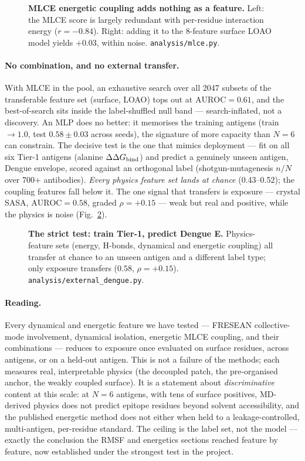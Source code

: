 \begin{figure}[H]\centering
{}
\caption{\textbf{MLCE energetic coupling adds nothing as a feature.} Left: the MLCE score is largely
redundant with per-residue interaction energy ($r=-0.84$). Right: adding it to the 8-feature surface LOAO
model yields $+0.03$, within noise. \texttt{analysis/mlce.py}.}
\label{fig:mlce-feature}
\end{figure}

\paragraph{No combination, and no external transfer.} With MLCE in the pool, an exhaustive search over all
2047 subsets of the transferable feature set (surface, LOAO) tops out at $\mathrm{AUROC}=0.61$, and the
best-of-search sits inside the label-shuffled null band --- search-inflated, not a discovery. An MLP does no
better: it memorises the training antigens (train $\to1.0$, test $0.58\pm0.03$ across seeds), the signature
of more capacity than $N=6$ can constrain. The decisive test is the one that mimics deployment --- fit on all
six Tier-1 antigens (alanine $\Delta\Delta G_{\mathrm{bind}}$) and predict a genuinely unseen antigen, Dengue envelope, scored against
an orthogonal label (shotgun-mutagenesis $n/N$ over 700+ antibodies). \emph{Every physics feature set lands at
chance} (0.43--0.52); the coupling features fall below it. The one signal that transfers is exposure ---
crystal SASA, $\mathrm{AUROC}=0.58$, graded $\rho=+0.15$ --- weak but real and positive, while the physics is
noise (Fig.~\ref{fig:external}).

\begin{figure}[H]\centering
{}
\caption{\textbf{The strict test: train Tier-1, predict Dengue E.} Physics-feature sets (energy, H-bonds,
dynamical and energetic coupling) all transfer at chance to an unseen antigen and a different label type;
only exposure transfers ($0.58$, $\rho=+0.15$). \texttt{analysis/external\_dengue.py}.}
\label{fig:external}
\end{figure}

\paragraph{Reading.} Every dynamical and energetic feature we have tested --- FRESEAN collective-mode
involvement, dynamical isolation, energetic MLCE coupling, and their combinations --- reduces to exposure
once evaluated on surface residues, across antigens, or on a held-out antigen. This is not a failure of the
methods; each measures real, interpretable physics (the decoupled patch, the pre-organised anchor, the weakly
coupled surface). It is a statement about \emph{discriminative} content at this scale: at $N=6$ antigens, with
tens of surface positives, MD-derived physics does not predict epitope residues beyond solvent accessibility,
and the published energetic method does not either when held to a leakage-controlled, multi-antigen,
per-residue standard. The ceiling is the label set, not the model --- exactly the conclusion the RMSF and
energetics sections reached feature by feature, now established under the strongest test in the project.


